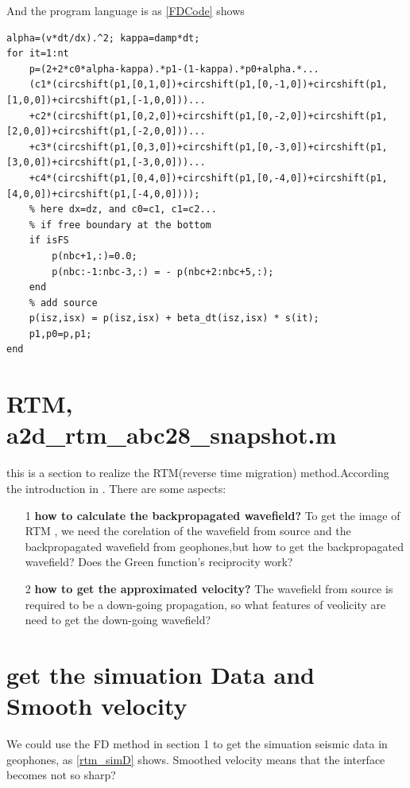 \documentclass[a4paper]{article}
\begin{document}
		And the program language is as \autoref{FDCode} shows
		\begin{lstlisting}[caption=set ABC to the velocity variable (2 is same), label=FDCode,basicstyle=\tiny, numberstyle=\tiny]
% 
alpha=(v*dt/dx).^2; kappa=damp*dt;
for it=1:nt
	p=(2+2*c0*alpha-kappa).*p1-(1-kappa).*p0+alpha.*...
	(c1*(circshift(p1,[0,1,0])+circshift(p1,[0,-1,0])+circshift(p1,[1,0,0])+circshift(p1,[-1,0,0]))...
	+c2*(circshift(p1,[0,2,0])+circshift(p1,[0,-2,0])+circshift(p1,[2,0,0])+circshift(p1,[-2,0,0]))...
	+c3*(circshift(p1,[0,3,0])+circshift(p1,[0,-3,0])+circshift(p1,[3,0,0])+circshift(p1,[-3,0,0]))...
	+c4*(circshift(p1,[0,4,0])+circshift(p1,[0,-4,0])+circshift(p1,[4,0,0])+circshift(p1,[-4,0,0]))); 
	% here dx=dz, and c0=c1, c1=c2...
	% if free boundary at the bottom
	if isFS
		p(nbc+1,:)=0.0;
		p(nbc:-1:nbc-3,:) = - p(nbc+2:nbc+5,:);
	end
	% add source
	p(isz,isx) = p(isz,isx) + beta_dt(isz,isx) * s(it);
	p1,p0=p,p1;
end
    	\end{lstlisting}


\section{RTM, a2d\_rtm\_abc28\_snapshot.m}	
	this is a section to realize the RTM(reverse time migration) method.According the introduction in \cite[Schuster 2015]{SI}. There are some aspects:

	\begin{itemize}
		\item[1] \textbf{how to calculate the backpropagated wavefield?} To get the image of RTM , we need the corelation of the wavefield from source and the backpropagated wavefield from geophones,but how to get the backpropagated wavefield? Does the Green function's reciprocity work?
		\item[2] \textbf{how to get the approximated velocity?} The wavefield from source is required to be a down-going propagation, so what features of veolicity are need to get the down-going wavefield?
	\end{itemize}

	\section{get the simuation Data and Smooth velocity}

	We could use the FD method in section 1 to get the simuation seismic data in geophones, as \autoref{rtm_simD} shows. Smoothed velocity means that the interface becomes not so sharp?
\end{document}
